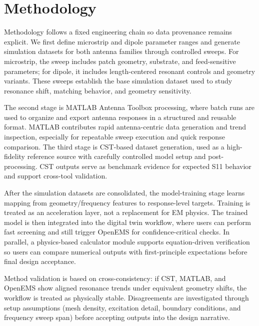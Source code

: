 \documentclass[12pt,a4paper]{article}
\begin{document}
\section{Methodology}
Methodology follows a fixed engineering chain so data provenance remains explicit. We first define microstrip and dipole parameter ranges and generate simulation datasets for both antenna families through controlled sweeps. For microstrip, the sweep includes patch geometry, substrate, and feed-sensitive parameters; for dipole, it includes length-centered resonant controls and geometry variants. These sweeps establish the base simulation dataset used to study resonance shift, matching behavior, and geometry sensitivity.

The second stage is MATLAB Antenna Toolbox processing, where batch runs are used to organize and export antenna responses in a structured and reusable format. MATLAB contributes rapid antenna-centric data generation and trend inspection, especially for repeatable sweep execution and quick response comparison. The third stage is CST-based dataset generation, used as a high-fidelity reference source with carefully controlled model setup and post-processing. CST outputs serve as benchmark evidence for expected S11 behavior and support cross-tool validation.

After the simulation datasets are consolidated, the model-training stage learns mapping from geometry/frequency features to response-level targets. Training is treated as an acceleration layer, not a replacement for EM physics. The trained model is then integrated into the digital twin workflow, where users can perform fast screening and still trigger OpenEMS for confidence-critical checks. In parallel, a physics-based calculator module supports equation-driven verification so users can compare numerical outputs with first-principle expectations before final design acceptance.

Method validation is based on cross-consistency: if CST, MATLAB, and OpenEMS show aligned resonance trends under equivalent geometry shifts, the workflow is treated as physically stable. Disagreements are investigated through setup assumptions (mesh density, excitation detail, boundary conditions, and frequency sweep span) before accepting outputs into the design narrative.
\end{document}
